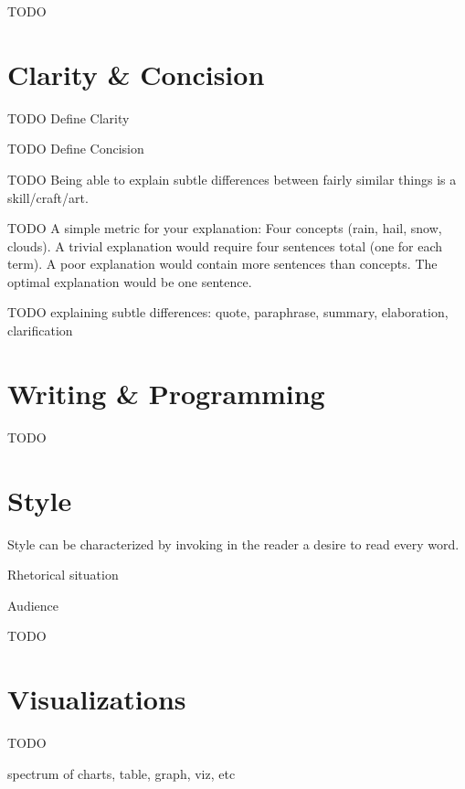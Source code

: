 \documentclass[10pt,a4paper]{book}
\begin{document}
\color{BrickRed}TODO\color{black}



\chapter{Clarity \& Concision}

\color{BrickRed}TODO\color{black}
Define Clarity

\color{BrickRed}TODO\color{black}
Define Concision

\color{BrickRed}TODO\color{black}
Being able to explain subtle differences between fairly similar things is a skill/craft/art.

\color{BrickRed}TODO\color{black}
A simple metric for your explanation:
Four concepts (rain, hail, snow, clouds).
A trivial explanation would require four sentences total (one for each term).
A poor explanation would contain more sentences than concepts.
The optimal explanation would be one sentence.

\color{BrickRed}TODO\color{black}
explaining subtle differences: quote, paraphrase, summary, elaboration, clarification


\chapter{Writing \& Programming}

\color{BrickRed}TODO\color{black}


\chapter{Style}\label{Style}


Style can be characterized by invoking in the reader a desire to read every word.

Rhetorical situation

Audience

\color{BrickRed}TODO\color{black}


\chapter{Visualizations}\label{Visualizations}

\color{BrickRed}TODO\color{black}

spectrum of charts, table, graph, viz, etc




\end{document}
